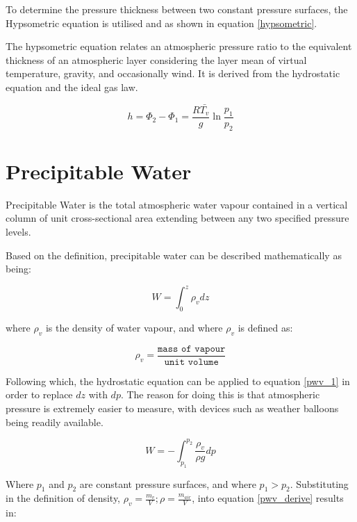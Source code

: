 To determine the pressure thickness between two constant pressure surfaces, the Hypsometric equation is utilised and as shown in equation \ref{hypsometric}. 

\begin{definition}
The hypsometric equation relates an atmospheric pressure ratio to the equivalent thickness of an atmospheric layer considering the layer mean of virtual temperature, gravity, and occasionally wind. It is derived from the hydrostatic equation and the ideal gas law.
\end{definition}

\begin{equation}
    \label{hypsometric}
    h = \Phi_2 - \Phi_1 = \frac{R \bar{T_v}}{g} \ln{\frac{p_1}{p_2}}
\end{equation}

\section{Precipitable Water}
\begin{definition}
Precipitable Water is the total atmospheric water vapour contained in a vertical column of unit cross-sectional area extending between any two specified pressure levels.
\end{definition}

Based on the definition, precipitable water can be described mathematically as being:

\begin{equation}
    \label{pwv_1}
    W = \int_{0}^{z} \rho_v dz
\end{equation}

where $\rho_v$ is the density of water vapour, and where $\rho_v$ is defined as:

\begin{equation}
    \rho_v = \frac{\texttt{mass of vapour}}{\texttt{unit volume}}
\end{equation}

Following which, the hydrostatic equation can be applied to equation \ref{pwv_1} in order to replace $dz$ with $dp$. The reason for doing this is that atmospheric pressure is extremely easier to measure, with devices such as weather balloons being readily available.

\begin{equation}
    \label{pwv_derive}
    W = -\int_{p_1}^{p_2} \frac{\rho_v}{\rho g} dp
\end{equation}

Where $p_1$ and $p_2$ are constant pressure surfaces, and where $p_1 > p_2$. Substituting in the definition of density, $\rho_v = \frac{m_v}{V}; \rho = \frac{m_{air}}{V}$, into equation \ref{pwv_derive} results in:

